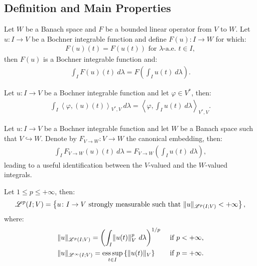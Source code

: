 \newpage
\subsection{Definition and Main Properties}

\begin{corollary}
    Let $W$ be a Banach space and $F$ be a bounded linear operator from $V$ to $W$. Let $u\colon I \rightarrow V$ be a Bochner integrable function and define $F(u) \colon I \rightarrow W$ for which:
    \begin{gather}
        F(u)(t) = F(u(t)) \text{ for } \lambda \text{-a.e. } t \in I,
    \end{gather}
    then $F(u)$ is a Bochner integrable function and:
    \begin{gather}
        \int_I F(u)(t) ~ d \lambda = F\left( \int_I u(t) ~ d \lambda \right).
    \end{gather}
\end{corollary}

\begin{remark} %
    Let $u\colon I \rightarrow V$ be a Bochner integrable function and let $\varphi \in V^*$, then:
    \begin{gather}
        \int_I \left\langle \varphi, (u)(t) \right\rangle_{V^*, V} ~ d \lambda = \left\langle \varphi, \int_I u(t) ~ d \lambda \right\rangle_{V^*, V}.
    \end{gather}
\end{remark}

\begin{remark}[Embedding]
    Let $u\colon I \rightarrow V$ be a Bochner integrable function and let $W$ be a Banach space such that $V \hookrightarrow W$. Denote by $F_{V \rightarrow W} \colon V \rightarrow W$ the canonical embedding, then:
    \begin{gather}
        \int_I F_{V \rightarrow W}(u)(t) ~ d \lambda = F_{V \rightarrow W}\left( \int_I u(t) ~ d \lambda \right),
    \end{gather}
    leading to a useful identification between the $V$-valued and the $W$-valued integrals.
\end{remark}

\begin{definition}[$\SpaceLp{p}(I; V)$]
    Let $1 \leq p \leq +\infty$, then:
    \begin{gather}
        \mathscr{L}^{p}(I; V) = \left\{ u \colon I \rightarrow V \text{ strongly measurable such that } \lVert u \rVert_{\mathscr{L}^{p}(I; V)} < +\infty \right\},
    \end{gather}
    where:
    \begin{align}
        & \lVert u \rVert_{\mathscr{L}^{p}(I; V)} = \left( \int_I \lVert u(t) \rVert_V^p ~ d \lambda \right)^{1/p} & \text{ if } p < +\infty, \\
        & \lVert u \rVert_{\mathscr{L}^{\infty}(I; V)} = \operatorname*{ess\,sup}_{t \in I} \left\{ \lVert u(t) \rVert_V \right\} & \text{ if } p = +\infty.
    \end{align}
\end{definition}

